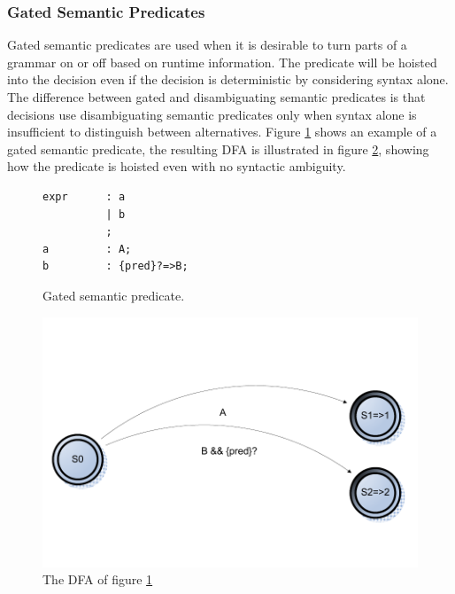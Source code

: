 \subsubsection{Gated Semantic Predicates}
Gated semantic predicates are used when it is desirable to turn parts of a grammar on or off based on runtime information. The predicate will be hoisted into the decision even if the decision is deterministic by considering syntax alone. The difference between gated and disambiguating semantic predicates is that decisions use disambiguating semantic predicates only when syntax alone is insufficient to distinguish between alternatives. Figure \ref{code:gatedSemantic} shows an example of a gated semantic predicate, the resulting DFA is illustrated in figure \ref{fig:dfaGated}, showing how the predicate is hoisted even with no syntactic ambiguity.

\begin{figure}[h!]
\begin{verbatim}
expr      : a 
          | b
          ; 
a         : A;
b         : {pred}?=>B;
\end{verbatim}
\caption{Gated semantic predicate.}
\label{code:gatedSemantic}
\end{figure}

\begin{figure}[!h]
  \centering
    \includegraphics[scale=0.6]{img/gatedsemantic}
  \caption{The DFA of figure \ref{code:gatedSemantic}}
  \label{fig:dfaGated}
\end{figure}


